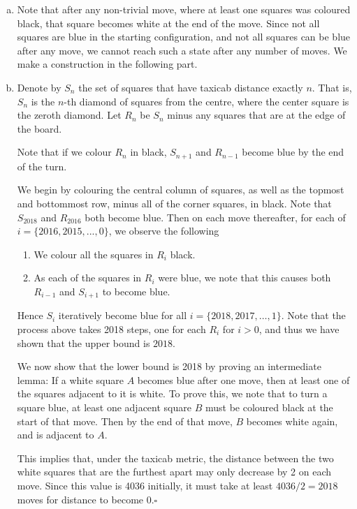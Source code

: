 \documentclass[10pt]{article}
\begin{document}
	\begin{enumerate}[(a)]
	\item Note that after any non-trivial move, where at least one squares was coloured black, that square becomes white at the end of the move. Since not all squares are blue in the starting configuration, and not all squares can be blue after any move, we cannot reach such a state after any number of moves. We make a construction in the following part.
	\item Denote by \(S_n\) the set of squares that have taxicab distance exactly \(n\). That is, \(S_n\) is the \(n\)-th diamond of squares from the centre, where the center square is the zeroth diamond. Let \(R_n\) be \(S_n\) minus any squares that are at the edge of the board.
	
	Note that if we colour \(R_{n}\) in black, \(S_{n+1}\) and \(R_{n-1}\) become blue by the end of the turn.
	
	We begin by colouring the central column of squares, as well as the topmost and bottommost row, minus all of the corner squares, in black. Note that \(S_{2018}\) and \(R_{2016}\) both become blue. Then on each move thereafter, for each of \(i = \{2016, 2015, ..., 0\}\), we observe the following
		\begin{enumerate}[1.]
		\item We colour all the squares in \(R_i\) black.
		\item As each of the squares in \(R_i\) were blue, we note that this causes both \(R_{i-1}\) and \(S_{i+1}\) to become blue.
		\end{enumerate}
	Hence \(S_i\) iteratively become blue for all \(i = \{2018, 2017, \dots, 1\}\). Note that the process above takes 2018 steps, one for each \(R_i\) for \(i > 0\), and thus we have shown that the upper bound is \(2018\).
		
	We now show that the lower bound is 2018 by proving an intermediate lemma: If a white square \(A\) becomes blue after one move, then at least one of the squares adjacent to it is white. To prove this, we note that to turn a square blue, at least one adjacent square \(B\) must be coloured black at the start of that move. Then by the end of that move, \(B\) becomes white again, and is adjacent to \(A\).
	
	This implies that, under the taxicab metric, the distance between the two white squares that are the furthest apart may only decrease by 2 on each move. Since this value is 4036 initially, it must take at least \(4036/2 = 2018\) moves for distance to become 0.\hfill\ensuremath{\square}\\
	\end{enumerate}
	
\end{document}
